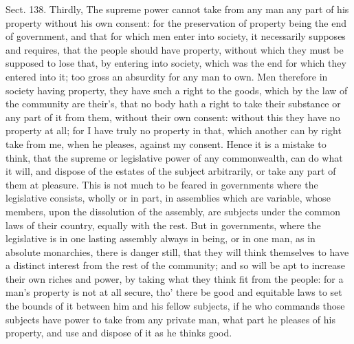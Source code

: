 \documentclass[11pt,openany]{book}
\begin{document}
Sect. 138. Thirdly, The supreme power cannot take from any man any part of his property without his own consent: for the preservation of property being the end of government, and that for which men enter into society, it necessarily supposes and requires, that the people should have property, without which they must be supposed to lose that, by entering into society, which was the end for which they entered into it; too gross an absurdity for any man to own. Men therefore in society having property, they have such a right to the goods, which by the law of the community are their's, that no body hath a right to take their substance or any part of it from them, without their own consent: without this they have no property at all; for I have truly no property in that, which another can by right take from me, when he pleases, against my consent. Hence it is a mistake to think, that the supreme or legislative power of any commonwealth, can do what it will, and dispose of the estates of the subject arbitrarily, or take any part of them at pleasure. This is not much to be feared in governments where the legislative consists, wholly or in part, in assemblies which are variable, whose members, upon the dissolution of the assembly, are subjects under the common laws of their country, equally with the rest. But in governments, where the legislative is in one lasting assembly always in being, or in one man, as in absolute monarchies, there is danger still, that they will think themselves to have a distinct interest from the rest of the community; and so will be apt to increase their own riches and power, by taking what they think fit from the people: for a man's property is not at all secure, tho' there be good and equitable laws to set the bounds of it between him and his fellow subjects, if he who commands those subjects have power to take from any private man, what part he pleases of his property, and use and dispose of it as he thinks good.
\end{document}
